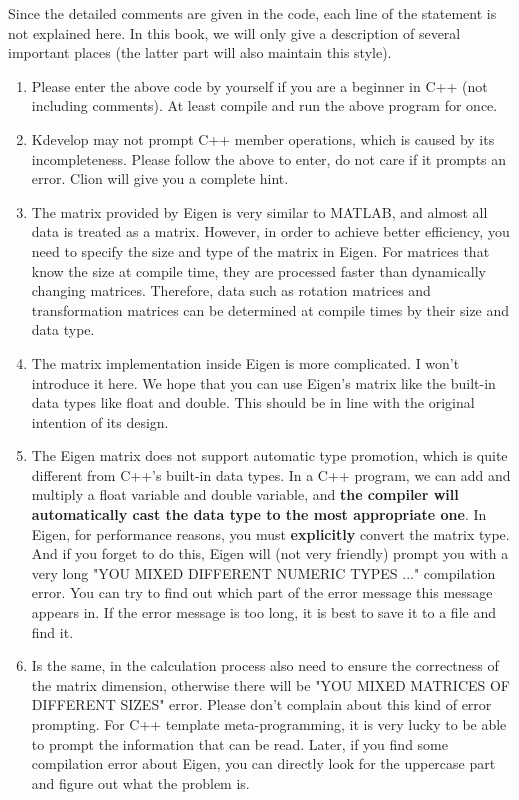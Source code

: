 Since the detailed comments are given in the code, each line of the statement is not explained here. In this book, we will only give a description of several important places (the latter part will also maintain this style).

\begin{enumerate}
    \item Please enter the above code by yourself if you are a beginner in C++ (not including comments). At least compile and run the above program for once.
    
    \item Kdevelop may not prompt C++ member operations, which is caused by its incompleteness. Please follow the above to enter, do not care if it prompts an error. Clion will give you a complete hint.
    
    \item The matrix provided by  Eigen is very similar to MATLAB, and almost all data is treated as a matrix. However, in order to achieve better efficiency, you need to specify the size and type of the matrix in Eigen. For matrices that know the size at compile time, they are processed faster than dynamically changing matrices. Therefore, data such as rotation matrices and transformation matrices can be determined at compile times by their size and data type.
    
    \item The matrix implementation inside  Eigen is more complicated. I won't introduce it here. We hope that you can use Eigen's matrix like the built-in data types like float and double. This should be in line with the original intention of its design.
    
    \item The  Eigen matrix does not support automatic type promotion, which is quite different from C++'s built-in data types. In a C++ program, we can add and multiply a float variable and double variable, and \textbf{the compiler will automatically cast the data type to the most appropriate one}. In Eigen, for performance reasons, you must \textbf{explicitly} convert the matrix type. And if you forget to do this, Eigen will (not very friendly) prompt you with a very long "YOU MIXED DIFFERENT NUMERIC TYPES ..." compilation error. You can try to find out which part of the error message this message appears in. If the error message is too long, it is best to save it to a file and find it.
    
    \item Is the same, in the calculation process also need to ensure the correctness of the matrix dimension, otherwise there will be "YOU MIXED MATRICES OF DIFFERENT SIZES" error. Please don't complain about this kind of error prompting. For C++ template meta-programming, it is very lucky to be able to prompt the information that can be read. Later, if you find some compilation error about Eigen, you can directly look for the uppercase part and figure out what the problem is.
    

\end{enumerate}
